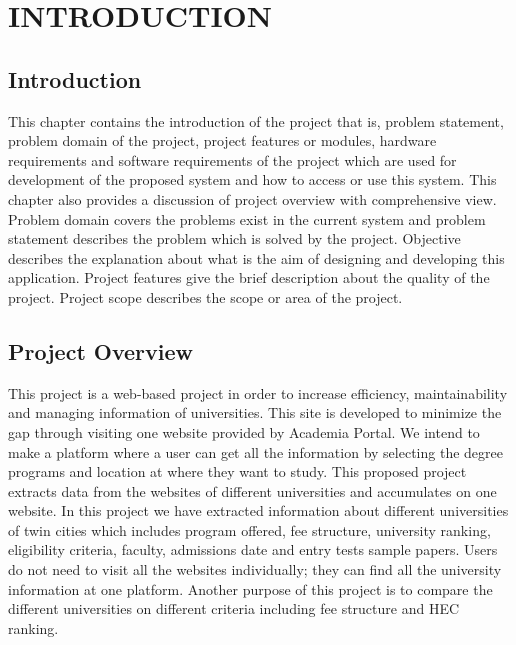 \chapter{INTRODUCTION}

\section{Introduction}

This chapter contains the introduction of the project that is, problem statement, problem domain of the project, project features or modules, hardware requirements and software requirements of the project which are used for development of the proposed system and how to access or use this system. This chapter also provides a discussion of project overview with comprehensive view. Problem domain covers the problems exist in the current system and problem statement describes the problem which is solved by the project. Objective describes the explanation about what is the aim of designing and developing this application. Project features give the brief description about the quality of the project. Project scope describes the scope or area of the project.

\section{Project Overview}

This project is a web-based project in order to increase efficiency, maintainability and managing information of universities. This site is developed to minimize the gap through visiting one website provided by Academia Portal. We intend to make a platform where a user can get all the information by selecting the degree programs and location at where they want to study. This proposed project extracts data from the websites of different universities and accumulates on one website. In this project we have extracted information about different universities of twin cities which includes program offered, fee structure, university ranking, eligibility criteria, faculty, admissions date and entry tests sample papers. Users do not need to visit all the websites individually; they can find all the university information at one platform. Another purpose of this project is to compare the different universities on different criteria including fee structure and HEC ranking.


